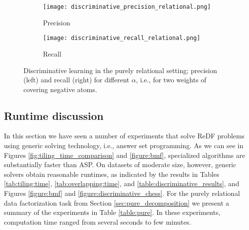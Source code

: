 \begin{figure}[thb]
\begin{center}
\begin{subfigure}{.49\textwidth}
  \captionsetup{skip = 2pt}
  \texttt{[image: discriminative\_precision\_relational.png]}
  \caption{Precision}
\end{subfigure}
   \hfill 
\begin{subfigure}{.49\textwidth}
  \captionsetup{skip = 2pt}
  \texttt{[image: discriminative\_recall\_relational.png]}
  \caption{Recall}
 \end{subfigure}
 \end{center}
  \captionsetup{skip = -4pt}
  \caption{Discriminative learning in the purely relational setting; precision (left) and recall (right) for different $\alpha$, i.e., for two weights of covering negative atoms.}
  \label{fig:discriminative_precision_recall_relational}
\end{figure}
\subsection{Runtime discussion} 

In this section we have seen a number of experiments that solve ReDF problems using generic solving technology, i.e., answer set programming. As we can see in Figures \ref{fig:tiling_time_comparison} and \ref{figure:bmf}, specialized algorithms are substantially faster than ASP. On datasets of moderate size, however, generic solvers obtain reasonable runtimes, as indicated by the results in Tables \ref{tab:tiling:time}, \ref{tab:overlapping:time}, and \ref{table:discriminative_results}, and Figures \ref{figure:bmf} and \ref{figure:discriminative_chess}. For the purely relational data factorization task from Section \ref{sec:pure_decomposition} we present a summary of the experiments in Table \ref{table:pure}. In these experiments, computation time ranged from several seconds to few minutes.




